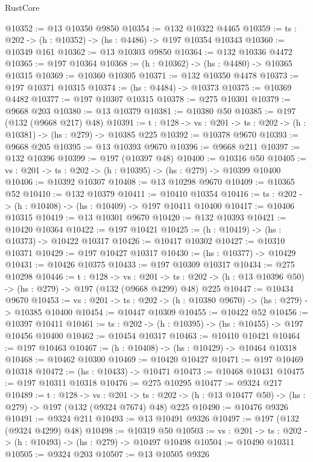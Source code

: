 \begin{lexlean}{RustCore}
\begin{coremodule}
@10352 := @13 @10350 @9850
@10354 := @132 @10322 @4465
@10359 := {ts : @202} -> (h : @10352) -> (hs : @4486) -> @197 @10354 @10343
@10360 := @10349 @161
@10362 := @13 @10303 @9850
@10364 := @132 @10336 @4472
@10365 := @197 @10364
@10368 := (h : @10362) -> (hs : @4480) -> @10365 @10315
@10369 := @10360 @10305
@10371 := @132 @10350 @4478
@10373 := @197 @10371 @10315
@10374 := (hs : @4484) -> @10373
@10375 := @10369 @4482
@10377 := @197 @10307 @10315
@10378 := @275 @10301
@10379 := @9668 @203
@10380 := @13 @10379
@10381 := @10380 @50
@10385 := @197 (@132 (@9668 @217) @48)
@10391 := {t : @128} -> {vs : @201} -> {ts : @202} -> (h : @10381) -> (hs : @279) -> @10385 @225
@10392 := @10378 @9670
@10393 := @9668 @205
@10395 := @13 @10393 @9670
@10396 := @9668 @211
@10397 := @132 @10396
@10399 := @197 (@10397 @48)
@10400 := @10316 @50
@10405 := {vs : @201} -> {ts : @202} -> (h : @10395) -> (hs : @279) -> @10399 @10400
@10406 := @10392 @10307
@10408 := @13 @10298 @9670
@10409 := @10365 @52
@10410 := @132 @10379
@10411 := @10410 @10354
@10416 := {ts : @202} -> (h : @10408) -> (hs : @10409) -> @197 @10411 @10400
@10417 := @10406 @10315
@10419 := @13 @10301 @9670
@10420 := @132 @10393
@10421 := @10420 @10364
@10422 := @197 @10421
@10425 := (h : @10419) -> (hs : @10373) -> @10422 @10317
@10426 := @10417 @10302
@10427 := @10310 @10371
@10429 := @197 @10427 @10317
@10430 := (hs : @10377) -> @10429
@10431 := @10426 @10375
@10433 := @197 @10309 @10317
@10434 := @275 @10298
@10446 := {t : @128} ->
  {vs : @201} ->
  {ts : @202} -> (h : @13 @10396 @50) -> (hs : @279) -> @197 (@132 (@9668 @4299) @48) @225
@10447 := @10434 @9670
@10453 := {vs : @201} -> {ts : @202} -> (h : @10380 @9670) -> (hs : @279) -> @10385 @10400
@10454 := @10447 @10309
@10455 := @10422 @52
@10456 := @10397 @10411
@10461 := {ts : @202} -> (h : @10395) -> (hs : @10455) -> @197 @10456 @10400
@10462 := @10454 @10317
@10463 := @10410 @10421
@10464 := @197 @10463
@10467 := (h : @10408) -> (hs : @10429) -> @10464 @10318
@10468 := @10462 @10300
@10469 := @10420 @10427
@10471 := @197 @10469 @10318
@10472 := (hs : @10433) -> @10471
@10473 := @10468 @10431
@10475 := @197 @10311 @10318
@10476 := @275 @10295
@10477 := @9324 @217
@10489 := {t : @128} ->
  {vs : @201} ->
  {ts : @202} -> (h : @13 @10477 @50) -> (hs : @279) -> @197 (@132 (@9324 @7674) @48) @225
@10490 := @10476 @9326
@10491 := @9324 @211
@10493 := @13 @10491 @9326
@10497 := @197 (@132 (@9324 @4299) @48)
@10498 := @10319 @50
@10503 := {vs : @201} -> {ts : @202} -> (h : @10493) -> (hs : @279) -> @10497 @10498
@10504 := @10490 @10311
@10505 := @9324 @203
@10507 := @13 @10505 @9326

\end{coremodule}
\end{lexlean}
